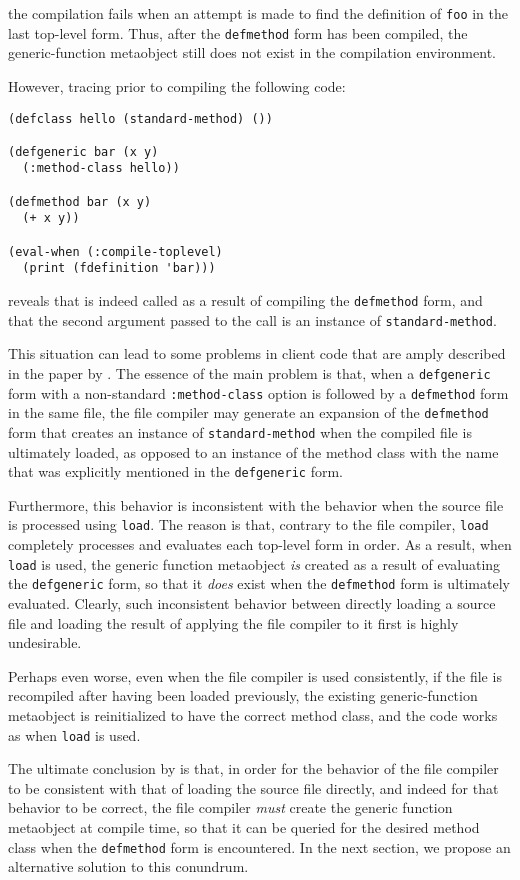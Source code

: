 \noindent
the compilation fails when an attempt is made to find the definition
of \texttt{foo} in the last top-level form.  Thus, after the
\texttt{defmethod} form has been compiled, the generic-function
metaobject still does not exist in the compilation environment.

However, tracing \mml{} prior to compiling the following code:

\begin{verbatim}
(defclass hello (standard-method) ())

(defgeneric bar (x y)
  (:method-class hello))

(defmethod bar (x y)
  (+ x y))

(eval-when (:compile-toplevel)
  (print (fdefinition 'bar)))
\end{verbatim}

\noindent
reveals that \mml{} is indeed called as a result of compiling the
\texttt{defmethod} form, and that the second argument passed to the
call is an instance of \texttt{standard-method}.

This situation can lead to some problems in client code that are amply
described in the paper by \cnh{}.  The essence of the
main problem is that, when a \texttt{defgeneric} form with a
non-standard \texttt{:method-class} option is followed by a
\texttt{defmethod} form in the same file, the file compiler may
generate an expansion of the \texttt{defmethod} form that creates an
instance of \texttt{standard-method} when the compiled file is
ultimately loaded, as opposed to an instance of the method class with
the name that was explicitly mentioned in the \texttt{defgeneric}
form.

Furthermore, this behavior is inconsistent with the behavior when the
source file is processed using \texttt{load}.  The reason is that,
contrary to the file compiler, \texttt{load} completely processes and
evaluates each top-level form in order.  As a result, when
\texttt{load} is used, the generic function metaobject \emph{is}
created as a result of evaluating the \texttt{defgeneric} form, so
that it \emph{does} exist when the \texttt{defmethod} form is
ultimately evaluated.  Clearly, such inconsistent behavior between
directly loading a source file and loading the result of applying the
file compiler to it first is highly undesirable.

Perhaps even worse, even when the file compiler is used consistently,
if the file is recompiled after having been loaded previously, the
existing generic-function metaobject is reinitialized to have the
correct method class, and the code works as when \texttt{load} is
used.

The ultimate conclusion by \cnh{} is that, in order for
the behavior of the file compiler to be consistent with that of
loading the source file directly, and indeed for that behavior to be
correct, the file compiler \emph{must} create the generic function
metaobject at compile time, so that it can be queried for the desired
method class when the \texttt{defmethod} form is encountered.  In the
next section, we propose an alternative solution to this conundrum.



